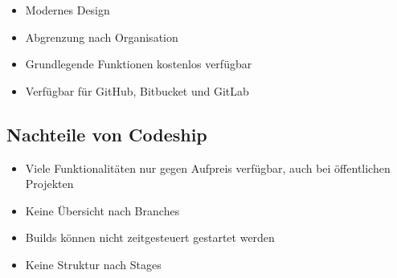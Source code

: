 \begin{itemize}
  \item Modernes Design
  \item Abgrenzung nach Organisation
  \item Grundlegende Funktionen kostenlos verfügbar
  \item Verfügbar für GitHub, Bitbucket und GitLab
\end{itemize}

\subsection*{Nachteile von Codeship}

\begin{itemize}
  \item Viele Funktionalitäten nur gegen Aufpreis verfügbar, auch bei öffentlichen Projekten
  \item Keine Übersicht nach Branches
  \item Builds können nicht zeitgesteuert gestartet werden
  \item Keine Struktur nach Stages
\end{itemize}
